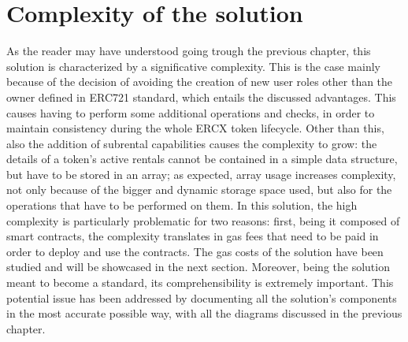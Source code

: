 \documentclass[english, LaM, oneside]{sapthesis}%
\begin{document}
\section{Complexity of the solution}
As the reader may have understood going trough the previous chapter, this solution is characterized by a significative complexity. This is the case mainly because of the decision of avoiding the creation of new user roles other than the owner defined in ERC721 standard, which entails the discussed advantages. This causes having to perform some additional operations and checks, in order to maintain consistency during the whole ERCX token lifecycle. \newline
Other than this, also the addition of subrental capabilities causes the complexity to grow: the details of a token's active rentals cannot be contained in a simple data structure, but have to be stored in an array; as expected, array usage increases complexity, not only because of the bigger and dynamic storage space used, but also for the operations that have to be performed on them. \newline
In this solution, the high complexity is particularly problematic for two reasons: first, being it composed of smart contracts, the complexity translates in gas fees that need to be paid in order to deploy and use the contracts. The gas costs of the solution have been studied and will be showcased in the next section. Moreover, being the solution meant to become a standard, its comprehensibility is extremely important. This potential issue has been addressed by documenting all the solution's components in the most accurate possible way, with all the diagrams discussed in the previous chapter.
\end{document}
